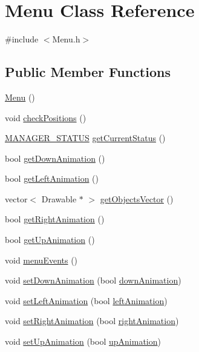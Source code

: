 \hypertarget{classMenu}{}\section{Menu Class Reference}
\label{classMenu}


{\ttfamily \#include $<$Menu.\+h$>$}

\subsection*{Public Member Functions}
\begin{DoxyCompactItemize}
\item 
\hyperlink{classMenu_ad466dd83355124a6ed958430450bfe94}{Menu} ()
\item 
void \hyperlink{classMenu_a0ab749d3c073f29d79070c4036aacf9d}{check\+Positions} ()
\item 
\hyperlink{Global_8h_a94049c48a0d77b80bca0fcb5b1281516}{M\+A\+N\+A\+G\+E\+R\+\_\+\+S\+T\+A\+T\+US} \hyperlink{classMenu_a2c11dd9aa1d02b232a2cd7d1b02d4790}{get\+Current\+Status} ()
\item 
bool \hyperlink{classMenu_aca94096321296262fe99d17d01556bad}{get\+Down\+Animation} ()
\item 
bool \hyperlink{classMenu_a2076597bda6ac7fcb654d19abc812a61}{get\+Left\+Animation} ()
\item 
vector$<$ Drawable $\ast$ $>$ \hyperlink{classMenu_a207642b71b3e74c8619f311e73eafffc}{get\+Objects\+Vector} ()
\item 
bool \hyperlink{classMenu_a114842e3e2fe84ca8ec08095dd08a92e}{get\+Right\+Animation} ()
\item 
bool \hyperlink{classMenu_a07c7b5c74648c47803ef1534b35c6584}{get\+Up\+Animation} ()
\item 
void \hyperlink{classMenu_a9a280ff90db10175b24a2d3d6515e3a8}{menu\+Events} ()
\item 
void \hyperlink{classMenu_aeebbcdcb7508e3cafc12ad1a32efc8e4}{set\+Down\+Animation} (bool \hyperlink{classMenu_aed34d6afbe07125d76062a534702cc96}{down\+Animation})
\item 
void \hyperlink{classMenu_a5b19e29c8681f88929c71d22a3327a0c}{set\+Left\+Animation} (bool \hyperlink{classMenu_a03bcd3608c9abd56b93c7ad12ee9a69e}{left\+Animation})
\item 
void \hyperlink{classMenu_aa5cd359d84a0296c42d099878410eeb8}{set\+Right\+Animation} (bool \hyperlink{classMenu_a8ce63316e4f8a2c57ca89e377ea7bb7d}{right\+Animation})
\item 
void \hyperlink{classMenu_ab94e0456a636056b422e4eb4b81aaf21}{set\+Up\+Animation} (bool \hyperlink{classMenu_add7681941b1c69a7ffd83838dfd0b308}{up\+Animation})
\end{DoxyCompactItemize}
